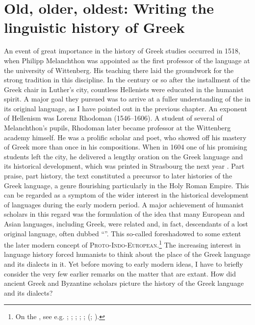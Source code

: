 \chapter{Old, older, oldest: Writing the linguistic history of Greek}\label{chap:5}

An event of great importance in the history of Greek studies occurred in 1518, when Philipp Melanchthon was appointed as the first professor of the language at the university of Wittenberg. His teaching there laid the groundwork for the strong  tradition in this discipline. In the century or so after the installment of the Greek chair in Luther’s city, countless Hellenists were educated in the humanist spirit. A major goal they pursued was to arrive at a fuller understanding of the  in its original language, as I have pointed out in the previous chapter. An exponent of  Hellenism was Lorenz Rhodoman (1546–1606). A student of several of Melanchthon’s pupils, Rhodoman later became professor at the Wittenberg academy himself. He was a prolific scholar and poet, who showed off his mastery of Greek more than once in his compositions. When in 1604 one of his promising students left the city, he delivered a lengthy oration on the Greek language and its historical development, which was printed in Strasbourg the next year \citep{Rhodomanus1605}. Part praise, part history, the text constituted a precursor to later histories of the Greek language, a genre flourishing particularly in the Holy Roman Empire. This can be regarded as a symptom of the wider interest in the historical development of languages during the early modern period. A major achievement of humanist scholars in this regard was the formulation of the idea that many European and Asian languages, including Greek, were related and, in fact, descendants of a lost original language, often dubbed “”. This so-called  foreshadowed to some extent the later modern concept of \textsc{Proto-Indo-European}.\footnote{On the , see e.g. \citet[34--39]{Metcalf2013}; \citet{Droixhe1980}; \citet[]{Swiggers1984, Swiggers1998}; \citet{Villani2003}; \citet{Considine2010}; \citeauthor{VanHal2010b} (\citeyear{VanHal2010b}; \citeyear[esp. 335–401, 473–475]{VanHal2010a}).} The increasing interest in language history forced humanists to think about the place of the Greek language and its dialects in it. Yet before moving to early modern ideas, I have to briefly consider the very few earlier remarks on the matter that are extant. How did ancient Greek and Byzantine scholars picture the history of the Greek language and its dialects?

